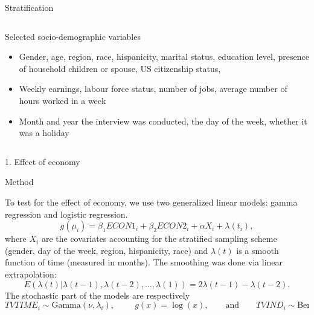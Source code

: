 \documentclass[final]{beamer}
\newcounter{acolumn}%
\def\autoheight{\vspace*{0pt}}%
\begin{document}
\begin{frame}
\begin{acolumns}[t]
\begin{column}{.24\linewidth}
\begin{block}{Stratification}
                \autoheight
               \end{block}
               
              \end{column}
               
              \begin{column}{.24\linewidth}
               \begin{block}{Selected socio-demographic variables}
                \begin{itemize}
                	\item Gender, age, region, race, hispanicity, marital status, education level, presence of household children or spouse, US citizenship status,
                	
                	\item Weekly earnings, labour force status, number of jobs, average number of hours worked in a week
                	
                	\item Month and year the interview was conducted, the day of the week, whether it was a holiday
                	
                \end{itemize}
                             
                \autoheight
               \end{block}
                  
              \end{column}
              
            \end{acolumns}
        
        
        \vfill
    
    \begin{acolumns}[t]
    
    \begin{column}{.72\linewidth}
    \begin{center}
   		\LARGE{1. Effect of economy}
    \end{center}
     \begin{block}{Method}
       
       To test for the effect of economy, we use two generalized linear models: gamma regression and logistic regression.
       $$g(\mu_i)=\beta_1ECON1_i+\beta_2ECON2_i + \alpha X_i + \lambda(t_i),$$
       where $X_i$ are the covariates accounting for the stratified sampling scheme (gender, day of the week, region, hispanicity, race) and $\lambda(t)$ is a smooth function of time (measured in months). The smoothing was done via linear extrapolation:
       $$E\left(\lambda(t)|\lambda(t-1),\lambda(t-2),\ldots,\lambda(1)\right) = 2\lambda(t-1) - \lambda(t-2).$$
       The stochastic part of the models are respectively
       $$TVTIME_i\sim \mathrm{Gamma}(\nu, \lambda_i),\hspace{1cm} g(x)=\log(x),\qquad\mbox{and}\qquad TVIND_i\sim \mathrm{Bernouilli}(\pi_i), \hspace{1cm} g(x)=\mathrm{logit}(x).$$
        

\end{block}
\end{column}
\end{acolumns}
\end{frame}
\end{document}

